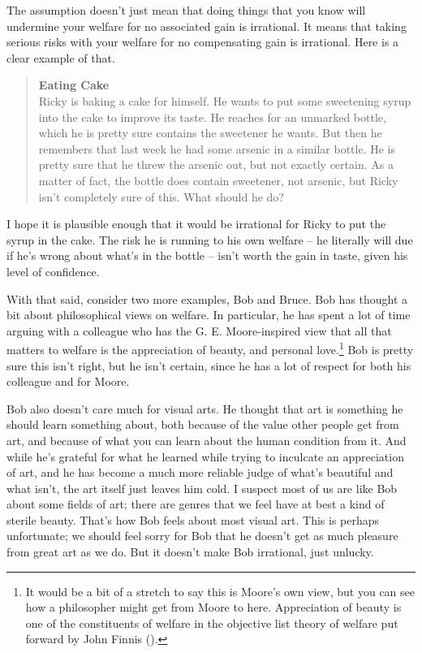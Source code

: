 \documentclass[
  11pt,
  letterpaper,
  DIV=11,
  numbers=noendperiod,
  twoside]{scrartcl}
\begin{document}
The assumption doesn't just mean that doing things that you know will
undermine your welfare for no associated gain is irrational. It means
that taking serious risks with your welfare for no compensating gain is
irrational. Here is a clear example of that.

\begin{quote}
\textbf{Eating Cake}\\
Ricky is baking a cake for himself. He wants to put some sweetening
syrup into the cake to improve its taste. He reaches for an unmarked
bottle, which he is pretty sure contains the sweetener he wants. But
then he remembers that last week he had some arsenic in a similar
bottle. He is pretty sure that he threw the arsenic out, but not exactly
certain. As a matter of fact, the bottle does contain sweetener, not
arsenic, but Ricky isn't completely sure of this. What should he do?
\end{quote}

I hope it is plausible enough that it would be irrational for Ricky to
put the syrup in the cake. The risk he is running to his own welfare --
he literally will due if he's wrong about what's in the bottle -- isn't
worth the gain in taste, given his level of confidence.

With that said, consider two more examples, Bob and Bruce. Bob has
thought a bit about philosophical views on welfare. In particular, he
has spent a lot of time arguing with a colleague who has the G. E.
Moore-inspired view that all that matters to welfare is the appreciation
of beauty, and personal love.\footnote{It would be a bit of a stretch to
  say this is Moore's own view, but you can see how a philosopher might
  get from Moore to here. Appreciation of beauty is one of the
  constituents of welfare in the objective list theory of welfare put
  forward by John Finnis ().} Bob
is pretty sure this isn't right, but he isn't certain, since he has a
lot of respect for both his colleague and for Moore.

Bob also doesn't care much for visual arts. He thought that art is
something he should learn something about, both because of the value
other people get from art, and because of what you can learn about the
human condition from it. And while he's grateful for what he learned
while trying to inculcate an appreciation of art, and he has become a
much more reliable judge of what's beautiful and what isn't, the art
itself just leaves him cold. I suspect most of us are like Bob about
some fields of art; there are genres that we feel have at best a kind of
sterile beauty. That's how Bob feels about most visual art. This is
perhaps unfortunate; we should feel sorry for Bob that he doesn't get as
much pleasure from great art as we do. But it doesn't make Bob
irrational, just unlucky.
\end{document}
